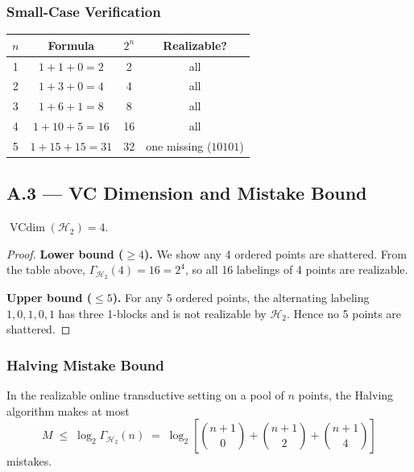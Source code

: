 \documentclass{article}
\begin{document}
\subsubsection{Small-Case Verification}
 
\begin{center}
\begin{tabular}{cccc}
\toprule
$n$ & Formula & $2^n$ & Realizable? \\
\midrule
1 & $1+1+0=2$ & 2 & all \\
2 & $1+3+0=4$ & 4 & all \\
3 & $1+6+1=8$ & 8 & all \\
4 & $1+10+5=16$ & 16 & all \\
5 & $1+15+15=31$ & 32 & one missing ($10101$) \\
\bottomrule
\end{tabular}
\end{center}
 
\subsection{A.3 --- VC Dimension and Mistake Bound}
 
\begin{summarybox}
$\operatorname{VCdim}(\mathcal{H}_2)=4$.
\end{summarybox}
 
\begin{proof}
\textbf{Lower bound ($\ge4$).}
We show any 4 ordered points are shattered.
From the table above, $\Gamma_{\mathcal{H}_2}(4)=16=2^4$, so all 16
labelings of 4 points are realizable.
 
\textbf{Upper bound ($\le5$).}
For any 5 ordered points, the alternating labeling $1,0,1,0,1$ has three
1-blocks and is not realizable by $\mathcal{H}_2$. Hence no 5 points are
shattered.
\end{proof}
 
\subsubsection{Halving Mistake Bound}
 
In the realizable online transductive setting on a pool of $n$ points, the
Halving algorithm makes at most
\[
  M \;\le\; \log_2 \Gamma_{\mathcal{H}_2}(n)
    \;=\; \log_2\!\left[\binom{n+1}{0}+\binom{n+1}{2}+\binom{n+1}{4}\right]
\]
mistakes.
 
\end{document}

